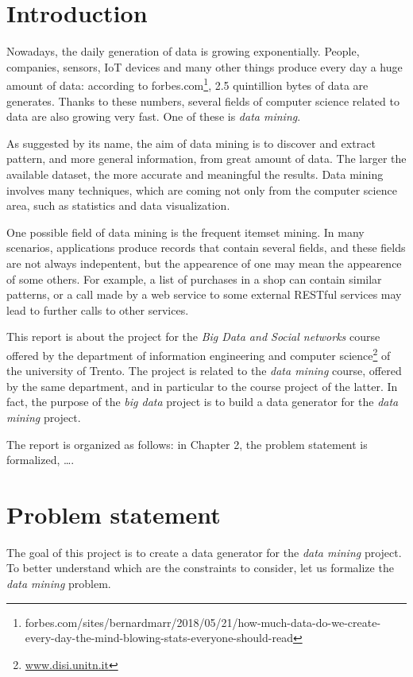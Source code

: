 \documentclass{acm_proc_article-sp-sigmod09}
\begin{document}
\section{Introduction}
Nowadays, the daily generation of data is growing exponentially. People, companies, sensors, IoT devices and many other things produce every day a huge amount of data: according to forbes.com\footnote{forbes.com/sites/bernardmarr/2018/05/21/how-much-data-do-we-create-every-day-the-mind-blowing-stats-everyone-should-read}, 2.5 quintillion bytes of data are generates. Thanks to these numbers, several fields of computer science related to data are also growing very fast. One of these is \emph{data mining}.

As suggested by its name, the aim of data mining is to discover and extract pattern, and more general information, from great amount of data. The larger the available dataset, the more accurate and meaningful the results. Data mining involves many techniques, which are coming not only from the computer science area, such as statistics and data visualization. 

One possible field of data mining is the frequent itemset mining. In many scenarios, applications produce records that contain several fields, and these fields are not always indepentent, but the appearence of one may mean the appearence of some others. For example, a list of purchases in a shop can contain similar patterns, or a call made by a web service to some external RESTful services may lead to further calls to other services.

This report is about the project for the \emph{Big Data and Social networks} course offered by the department of information engineering and computer science\footnote{\url{www.disi.unitn.it}} of the university of Trento. The project is related to the \emph{data mining} course, offered by the same department, and in particular to the course project of the latter. In fact, the purpose of the \emph{big data} project is to build a data generator for the \emph{data mining} project.

The report is organized as follows: in Chapter 2, the problem statement is formalized, \dots.

\section{Problem statement}
The goal of this project is to create a data generator for the \emph{data mining} project. To better understand which are the constraints to consider, let us formalize the \emph{data mining} problem.
\end{document}
